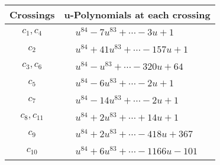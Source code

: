 \documentclass[1p]{elsarticle_modified}
\theoremstyle{definition}
\begin{document}
\begin{tabular}{m{50pt}|m{274pt}}
Crossings & \hspace{64pt}u-Polynomials at each crossing \\
\hline $$\begin{aligned}c_{1},c_{4}\end{aligned}$$&$\begin{aligned}
&u^{84}-7 u^{83}+\cdots-3 u+1
\end{aligned}$\\
\hline $$\begin{aligned}c_{2}\end{aligned}$$&$\begin{aligned}
&u^{84}+41 u^{83}+\cdots-157 u+1
\end{aligned}$\\
\hline $$\begin{aligned}c_{3},c_{6}\end{aligned}$$&$\begin{aligned}
&u^{84}- u^{83}+\cdots-320 u+64
\end{aligned}$\\
\hline $$\begin{aligned}c_{5}\end{aligned}$$&$\begin{aligned}
&u^{84}-6 u^{83}+\cdots-2 u+1
\end{aligned}$\\
\hline $$\begin{aligned}c_{7}\end{aligned}$$&$\begin{aligned}
&u^{84}-14 u^{83}+\cdots-2 u+1
\end{aligned}$\\
\hline $$\begin{aligned}c_{8},c_{11}\end{aligned}$$&$\begin{aligned}
&u^{84}+2 u^{83}+\cdots+14 u+1
\end{aligned}$\\
\hline $$\begin{aligned}c_{9}\end{aligned}$$&$\begin{aligned}
&u^{84}+2 u^{83}+\cdots-418 u+367
\end{aligned}$\\
\hline $$\begin{aligned}c_{10}\end{aligned}$$&$\begin{aligned}
&u^{84}+6 u^{83}+\cdots-1166 u-101
\end{aligned}$\\
\hline
\end{tabular}\\~\\
\end{document}
